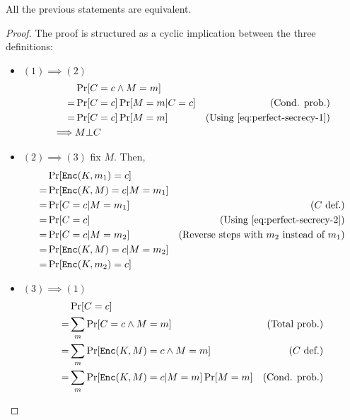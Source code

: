 \begin{proposition}
    All the previous statements are equivalent.
\end{proposition}
\begin{proof}
    The proof is structured as a cyclic implication between the three definitions:
%
    \begin{itemize}
    	\item $(1) \implies (2)$
        \begin{align*}
            & \Pr[C = c \wedge M = m] \\
            =& \Pr[C = c] \Pr[M = m|C = c] & \text{(Cond. prob.)} \\
            =& \Pr[C = c] \Pr[M = m] & \text{(Using \ref{eq:perfect-secrecy-1})} \\
            \implies& M \bot C
        \end{align*}
%
        \item $(2) \implies (3)$ fix $M$. Then,
        \begin{align*}
            & \Pr[\texttt{Enc}(K, m_1) = c] & \\
            =& \Pr[\texttt{Enc}(K, M) = c| M = m_1] & \\
            =& \Pr[C = c|M = m_1] & \text{($C$ def.)} \\
            =& \Pr[C = c] & \text{(Using \ref{eq:perfect-secrecy-2})} \\
            =& \Pr[C = c|M = m_2] & \text{(Reverse steps with $m_2$ instead of $m_1$)} \\
            =& \Pr[\texttt{Enc}(K, M) = c| M = m_2] & \\
            =& \Pr[\texttt{Enc}(K, m_2) = c] &
        \end{align*}
%
        \item $(3) \implies (1)$
        \begin{align*}
            & \Pr[C \evaluatesto c] & \\
            =& \sum_{m}\Pr[C \evaluatesto c \wedge M \evaluatesto m] & \text{(Total prob.)} \\
            =& \sum_{m}\Pr[\Enc(K, M) \evaluatesto c \wedge M \evaluatesto m] & \text{($C$ def.)} \\
            =& \sum_{m}\Pr[\Enc(K, M) \evaluatesto c|M \evaluatesto m]\Pr[M \evaluatesto m] & \text{(Cond. prob.)} \\

\end{align*}
\end{itemize}
\end{proof}
